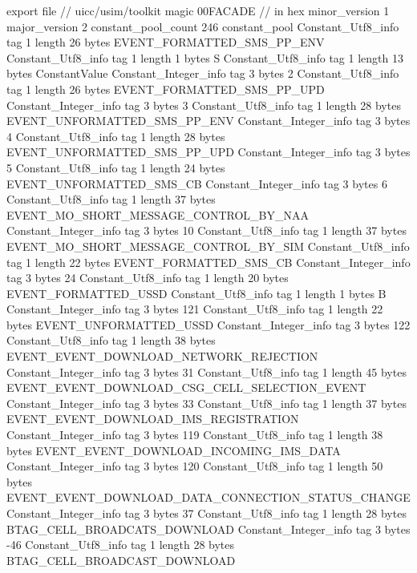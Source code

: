 export file {		// uicc/usim/toolkit
	magic	00FACADE		 // in hex
	minor_version	1
	major_version	2
	constant_pool_count	246
	constant_pool {
		Constant_Utf8_info {
			tag	1
			length	26
			bytes	EVENT_FORMATTED_SMS_PP_ENV
		}
		Constant_Utf8_info {
			tag	1
			length	1
			bytes	S
		}
		Constant_Utf8_info {
			tag	1
			length	13
			bytes	ConstantValue
		}
		Constant_Integer_info {
			tag	3
			bytes	2
		}
		Constant_Utf8_info {
			tag	1
			length	26
			bytes	EVENT_FORMATTED_SMS_PP_UPD
		}
		Constant_Integer_info {
			tag	3
			bytes	3
		}
		Constant_Utf8_info {
			tag	1
			length	28
			bytes	EVENT_UNFORMATTED_SMS_PP_ENV
		}
		Constant_Integer_info {
			tag	3
			bytes	4
		}
		Constant_Utf8_info {
			tag	1
			length	28
			bytes	EVENT_UNFORMATTED_SMS_PP_UPD
		}
		Constant_Integer_info {
			tag	3
			bytes	5
		}
		Constant_Utf8_info {
			tag	1
			length	24
			bytes	EVENT_UNFORMATTED_SMS_CB
		}
		Constant_Integer_info {
			tag	3
			bytes	6
		}
		Constant_Utf8_info {
			tag	1
			length	37
			bytes	EVENT_MO_SHORT_MESSAGE_CONTROL_BY_NAA
		}
		Constant_Integer_info {
			tag	3
			bytes	10
		}
		Constant_Utf8_info {
			tag	1
			length	37
			bytes	EVENT_MO_SHORT_MESSAGE_CONTROL_BY_SIM
		}
		Constant_Utf8_info {
			tag	1
			length	22
			bytes	EVENT_FORMATTED_SMS_CB
		}
		Constant_Integer_info {
			tag	3
			bytes	24
		}
		Constant_Utf8_info {
			tag	1
			length	20
			bytes	EVENT_FORMATTED_USSD
		}
		Constant_Utf8_info {
			tag	1
			length	1
			bytes	B
		}
		Constant_Integer_info {
			tag	3
			bytes	121
		}
		Constant_Utf8_info {
			tag	1
			length	22
			bytes	EVENT_UNFORMATTED_USSD
		}
		Constant_Integer_info {
			tag	3
			bytes	122
		}
		Constant_Utf8_info {
			tag	1
			length	38
			bytes	EVENT_EVENT_DOWNLOAD_NETWORK_REJECTION
		}
		Constant_Integer_info {
			tag	3
			bytes	31
		}
		Constant_Utf8_info {
			tag	1
			length	45
			bytes	EVENT_EVENT_DOWNLOAD_CSG_CELL_SELECTION_EVENT
		}
		Constant_Integer_info {
			tag	3
			bytes	33
		}
		Constant_Utf8_info {
			tag	1
			length	37
			bytes	EVENT_EVENT_DOWNLOAD_IMS_REGISTRATION
		}
		Constant_Integer_info {
			tag	3
			bytes	119
		}
		Constant_Utf8_info {
			tag	1
			length	38
			bytes	EVENT_EVENT_DOWNLOAD_INCOMING_IMS_DATA
		}
		Constant_Integer_info {
			tag	3
			bytes	120
		}
		Constant_Utf8_info {
			tag	1
			length	50
			bytes	EVENT_EVENT_DOWNLOAD_DATA_CONNECTION_STATUS_CHANGE
		}
		Constant_Integer_info {
			tag	3
			bytes	37
		}
		Constant_Utf8_info {
			tag	1
			length	28
			bytes	BTAG_CELL_BROADCATS_DOWNLOAD
		}
		Constant_Integer_info {
			tag	3
			bytes	-46
		}
		Constant_Utf8_info {
			tag	1
			length	28
			bytes	BTAG_CELL_BROADCAST_DOWNLOAD
}}}
